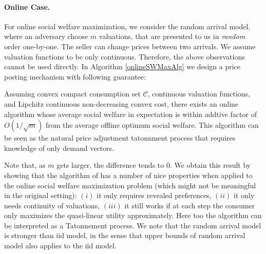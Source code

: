 

\paragraph{Online Case.}
For online social welfare maximization, we consider the random arrival model, where an adversary choose $m$ valuations, that are presented to us in {\em random} order one-by-one. The seller can change prices between two arrivals. We assume valuation functions to be only continuous. Therefore, the above observations cannot be used directly. %
In Algorithm \ref{onlineSWMaxAlg} we design a price posting mechanism with following guarantee:


\begin{theorem}[Informal]
Assuming convex compact consumption set $\mathcal{C}$, continuous valuation functions, and Lipchitz continuous non-decreasing convex cost, there exists an online algorithm whose average social welfare in expectation is within addtive factor of $O(1/\sqrt{m})$ from the average offline optimum social welfare. This algorithm can be seen as the natural price adjustment tatonnment process that requires knowledge of only demand vectors. %
\end{theorem}

Note that, as $m$ gets larger, the difference tends to $0$. We obtain this result by showing that the algorithm of \cite{AD15} has a number of nice properties when applied to the online social welfare maximization problem (which might not be meaningful in the original setting): $(i)$ it only requires revealed preferences, $(ii)$ it only needs continuity of valuations, $(iii)$ it still works if at each step the consumer only maximizes the quasi-linear utility approximately.
Here too the algorithm can be interpreted as a Tatonnement process. We note that the random arrival model is stronger than iid model, in the sense that upper bounds of random arrival model also applies to the iid model.

